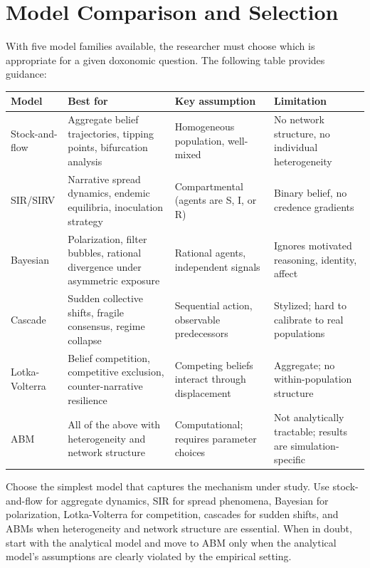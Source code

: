 \section{Model Comparison and Selection}
\label{sec:ch11-comparison}

With five model families available, the researcher must choose which is appropriate for a given doxonomic question.
The following table provides guidance:

\begin{center}
\begin{tabular}{p{3cm}p{3.5cm}p{3.5cm}p{3.5cm}}
\toprule
\textbf{Model} & \textbf{Best for} & \textbf{Key assumption} & \textbf{Limitation} \\
\midrule
Stock-and-flow & Aggregate belief trajectories, tipping points, bifurcation analysis & Homogeneous population, well-mixed & No network structure, no individual heterogeneity \\
SIR/SIRV & Narrative spread dynamics, endemic equilibria, inoculation strategy & Compartmental (agents are S, I, or R) & Binary belief, no credence gradients \\
Bayesian & Polarization, filter bubbles, rational divergence under asymmetric exposure & Rational agents, independent signals & Ignores motivated reasoning, identity, affect \\
Cascade & Sudden collective shifts, fragile consensus, regime collapse & Sequential action, observable predecessors & Stylized; hard to calibrate to real populations \\
Lotka-Volterra & Belief competition, competitive exclusion, counter-narrative resilience & Competing beliefs interact through displacement & Aggregate; no within-population structure \\
ABM & All of the above with heterogeneity and network structure & Computational; requires parameter choices & Not analytically tractable; results are simulation-specific \\
\bottomrule
\end{tabular}
\end{center}

\begin{principle}
\label{prin:model-selection}
Choose the simplest model that captures the mechanism under study.
Use stock-and-flow for aggregate dynamics, SIR for spread phenomena, Bayesian for polarization, Lotka-Volterra for competition, cascades for sudden shifts, and ABMs when heterogeneity and network structure are essential.
When in doubt, start with the analytical model and move to ABM only when the analytical model's assumptions are clearly violated by the empirical setting.
\end{principle}


